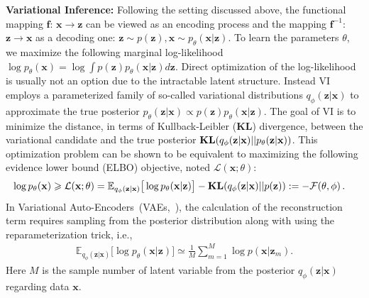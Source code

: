 \documentclass{article}
\begin{document}
\textbf{Variational Inference:}
Following the setting discussed above, the functional mapping $\mathbf{f}$: $\mathbf{x} \xrightarrow{} \mathbf{z}$ can be viewed as an encoding process and the mapping $\mathbf{f}^{-1}$: $\mathbf{z} \xrightarrow{} \mathbf{x}$ as a decoding one: $\mathbf{z} \sim p(\mathbf{z}), \mathbf{x} \sim p_{\theta}(\mathbf{x}|\mathbf{z}).$
To learn the parameters $\theta$, we maximize the following marginal log-likelihood $ \log p_{\theta}(\mathbf{x}) = \log \int p(\mathbf{z})  p_{\theta}(\mathbf{x}|\mathbf{z})d\mathbf{z}$.
Direct optimization of the log-likelihood is usually not an option due to the intractable latent structure. Instead VI employs a parameterized family of so-called variational distributions $q_{\phi}(\mathbf{z}|\mathbf{x})$ to approximate the true posterior $p_{\theta}(\mathbf{z}|\mathbf{x}) \varpropto  p(\mathbf{z})  p_{\theta}(\mathbf{x}|\mathbf{z})$.
The goal of VI is to minimize the distance, in terms of Kullback-Leibler ($\mathbf{KL}$) divergence, between the variational candidate and the true posterior $\textbf{\text{KL}}(q_{\phi}(\mathbf{z}|\mathbf{x})||p_{\theta}(\mathbf{z}|\mathbf{x}) )$.
This optimization problem can be shown to be equivalent to maximizing the following evidence lower bound (ELBO) objective, noted $\mathcal{L}(\mathbf{x}; \theta)$: 
\begin{align*}%
    \log p_{\theta}(\mathbf{x})
    &\geqslant \mathcal{L}(\mathbf{x}; \theta) =\mathbb{E}_{q_{\phi}(\mathbf{z}|\mathbf{x})} \big[\log p_{\theta}(\mathbf{x}|\mathbf{z}) \big] - \textbf{\text{KL}}(q_{\phi}(\mathbf{z}|\mathbf{x})||p(\mathbf{z})) :=-\mathcal{F}(\theta, \phi) \, .
\end{align*} %
In Variational Auto-Encoders~(VAEs,~\cite{kingma2013auto}), the calculation of the reconstruction term requires sampling from the posterior distribution along with using the reparameterization trick, i.e.,
\begin{align} \label{eq:vae_recon}
\mathbb{E}_{q_{\phi}(\mathbf{z}|\mathbf{x})} \big[\log p_{\theta}(\mathbf{x}|\mathbf{z}) \big] \simeq \frac{1}{M}\sum_{m=1}^M \log p(\mathbf{x}| \mathbf{z}_{m}). \end{align} %
Here $M$ is the sample number of latent variable from the posterior $q_{\phi}(\mathbf{z}|\mathbf{x})$ regarding data $\mathbf{x}$. 
\end{document}
